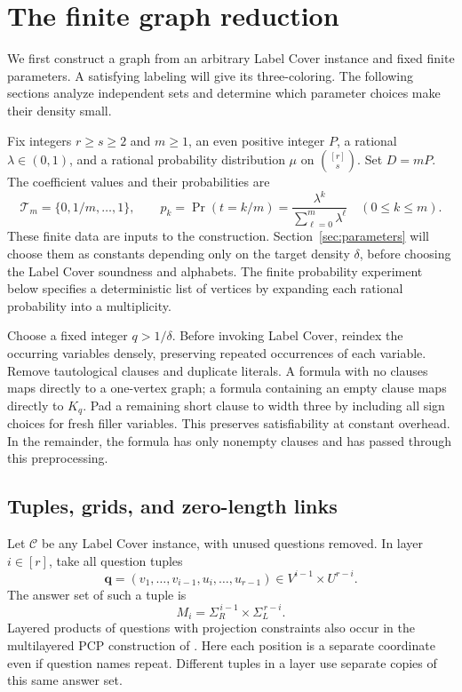 \section{The finite graph reduction}
\label{sec:construction}

We first construct a graph from an arbitrary Label Cover instance and
fixed finite parameters. A satisfying labeling will give its
three-coloring. The following sections analyze independent sets and
determine which parameter choices make their density small.

Fix integers $r\ge s\ge2$ and $m\ge1$, an even positive integer $P$,
a rational $\lambda\in(0,1)$, and a rational probability distribution
$\mu$ on $\binom{[r]}s$. Set $D=mP$. The coefficient values and their
probabilities are
\begin{equation}\label{eq:coefficient-law}
 \mathcal T_m=\{0,1/m,\ldots,1\},\qquad
 p_k=\Pr(t=k/m)=\frac{\lambda^k}{\sum_{\ell=0}^m\lambda^\ell}
 \quad(0\le k\le m).
\end{equation}
These finite data are inputs to the construction. Section~\ref{sec:parameters}
will choose them as constants depending only on the target density
$\delta$, before choosing the Label Cover soundness and alphabets.
The finite probability experiment below specifies a deterministic list
of vertices by expanding each rational probability into a multiplicity.

Choose a fixed integer $q>1/\delta$. Before invoking Label Cover,
reindex the occurring variables densely, preserving repeated occurrences
of each variable. Remove tautological clauses and duplicate literals.
A formula with no clauses maps directly to a one-vertex graph; a formula
containing an empty clause maps directly to $K_q$.
Pad a remaining short clause to width three by including all sign choices
for fresh filler variables. This preserves satisfiability at constant
overhead. In the remainder, the formula has only nonempty clauses and
has passed through this preprocessing.

\subsection{Tuples, grids, and zero-length links}

Let $\mathcal C$ be any Label Cover instance, with unused questions
removed. In layer $i\in[r]$, take all question
tuples
\[
 \mathbf q=(v_1,\ldots,v_{i-1},u_i,\ldots,u_{r-1})
 \in V^{i-1}\times U^{r-i}.
\]
The answer set of such a tuple is
\[
 M_i=\Sigma_R^{\,i-1}\times\Sigma_L^{\,r-i}.
\]
Layered products of questions with projection constraints also occur in
the multilayered PCP construction of \cite{DinurGuruswamiKhotRegev2005}.
Here each position is a separate coordinate even if question names repeat.
Different tuples in a layer use separate copies of this same answer set.

